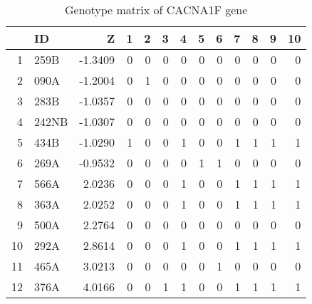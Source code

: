\documentclass{article}
\begin{document}
\begin{table}[tbp]
\centering
\caption{Genotype matrix of CACNA1F gene} 
\label{tab:a1F}
{\small
\begin{tabular}{rlrrrrrrrrrrr}
  \hline
 & ID & Z & 1 & 2 & 3 & 4 & 5 & 6 & 7 & 8 & 9 & 10 \\ 
  \hline
1 & 259B & -1.3409 & 0 & 0 & 0 & 0 & 0 & 0 & 0 & 0 & 0 & 0 \\ 
  2 & 090A & -1.2004 & 0 & 1 & 0 & 0 & 0 & 0 & 0 & 0 & 0 & 0 \\ 
  3 & 283B & -1.0357 & 0 & 0 & 0 & 0 & 0 & 0 & 0 & 0 & 0 & 0 \\ 
  4 & 242NB & -1.0307 & 0 & 0 & 0 & 0 & 0 & 0 & 0 & 0 & 0 & 0 \\ 
  5 & 434B & -1.0290 & 1 & 0 & 0 & 1 & 0 & 0 & 1 & 1 & 1 & 1 \\ 
  6 & 269A & -0.9532 & 0 & 0 & 0 & 0 & 1 & 1 & 0 & 0 & 0 & 0 \\ 
  7 & 566A & 2.0236 & 0 & 0 & 0 & 1 & 0 & 0 & 1 & 1 & 1 & 1 \\ 
  8 & 363A & 2.0252 & 0 & 0 & 0 & 1 & 0 & 0 & 1 & 1 & 1 & 1 \\ 
  9 & 500A & 2.2764 & 0 & 0 & 0 & 0 & 0 & 0 & 0 & 0 & 0 & 0 \\ 
  10 & 292A & 2.8614 & 0 & 0 & 0 & 1 & 0 & 0 & 1 & 1 & 1 & 1 \\ 
  11 & 465A & 3.0213 & 0 & 0 & 0 & 0 & 0 & 1 & 0 & 0 & 0 & 0 \\ 
  12 & 376A & 4.0166 & 0 & 0 & 1 & 1 & 0 & 0 & 1 & 1 & 1 & 1 \\ 
   \hline
\end{tabular}
}
\end{table}
\end{document}
